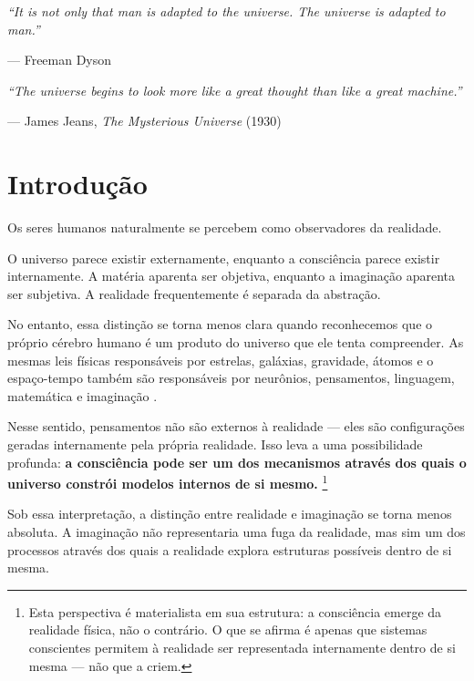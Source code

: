 \documentclass[12pt,a4paper]{article}
\begin{document}
\tableofcontents
\newpage

\epigraph{%
  \textit{``It is not only that man is adapted to the universe.
  The universe is adapted to man.''}%
}{--- Freeman Dyson}

\vspace{1em}

\epigraph{%
  \textit{``The universe begins to look more like a great thought
  than like a great machine.''}%
}{--- James Jeans, \textit{The Mysterious Universe} (1930)}

\newpage

\section{Introdução}

Os seres humanos naturalmente se percebem como observadores da realidade.

O universo parece existir externamente, enquanto a consciência parece existir
internamente. A matéria aparenta ser objetiva, enquanto a imaginação aparenta
ser subjetiva. A realidade frequentemente é separada da abstração.

No entanto, essa distinção se torna menos clara quando reconhecemos que o
próprio cérebro humano é um produto do universo que ele tenta compreender.
As mesmas leis físicas responsáveis por estrelas, galáxias, gravidade, átomos
e o espaço-tempo também são responsáveis por neurônios, pensamentos,
linguagem, matemática e imaginação \citep{penrose1989, hofstadter1979}.

Nesse sentido, pensamentos não são externos à realidade — eles são
configurações geradas internamente pela própria realidade. Isso leva a uma
possibilidade profunda: \textbf{a consciência pode ser um dos mecanismos
através dos quais o universo constrói modelos internos de si mesmo.}%
\footnote{Esta perspectiva é materialista em sua estrutura: a consciência
  emerge da realidade física, não o contrário. O que se afirma é apenas
  que sistemas conscientes permitem à realidade ser representada internamente
  dentro de si mesma — não que a criem.}

Sob essa interpretação, a distinção entre realidade e imaginação se torna
menos absoluta. A imaginação não representaria uma fuga da realidade,
mas sim um dos processos através dos quais a realidade explora estruturas
possíveis dentro de si mesma.
\end{document}
